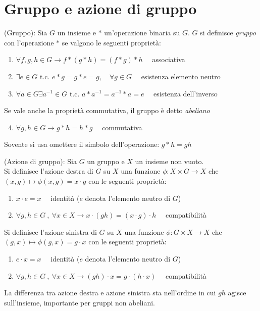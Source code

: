 \section{Gruppo e azione di gruppo}

\begin{definition}{(Gruppo)}:
   Sia $G$ un insieme e $*$ un'operazione binaria su $G$. $G$ si definisce
   \emph{gruppo} con l'operazione $*$ se valgono le seguenti proprietà:
   \begin{enumerate}
      \item $ \forall f,g,h \in G \to f*(g*h) = (f*g)*h \quad$ associativa
      \item $ \exists e \in G $ t.c. $ e*g = g*e = g ,\quad \forall g \in G \quad$
       esistenza elemento neutro
      \item $ \forall a \in G \exists a^{-1} \in G $ t.c. $a*a^{-1} = a^{-1}*a = e \quad$
         esistenza dell'inverso
   \end{enumerate}
   Se vale anche la proprietà commutativa, il gruppo è detto \emph{abeliano}
   \begin{enumerate}\setcounter{enumi}{3}
      \item $ \forall g,h \in G \to g*h = h*g \quad$ commutativa
   \end{enumerate}
\end{definition}
Sovente si usa omettere il simbolo dell'operazione: $ g*h = gh $
\begin{definition}{(Azione di gruppo):}\label{def:groupaction}
   Sia $G$ un gruppo e $X$ un insieme non vuoto. \\
   Si definisce l'azione destra di $G$ su $X$
   una funzione $\phi : X \times G \to X$ che $(x,g) \mapsto \phi(x,g) = x \cdot g$
   con le seguenti proprietà:
   \begin{enumerate}
      \item $x \cdot e = x \quad$ identità
          ($e$ denota l'elemento neutro di $G$)
      \item $\forall g,h \in G \: , \: \forall x \in X \to
         x\cdot (gh) = (x \cdot g) \cdot h \quad $ compatibilità
   \end{enumerate}
   Si definisce l'azione sinistra di $G$ su $X$
   una funzione $\phi : G \times X \to X$ che $(g,x) \mapsto \phi(g,x) =  g \cdot x $
   con le seguenti proprietà:
   \begin{enumerate}
      \item $e \cdot x = x \quad$ identità
          ($e$ denota l'elemento neutro di $G$)
      \item $\forall g,h \in G \: , \: \forall x \in X \to
         (gh) \cdot x  = g \cdot (h \cdot x) \quad $ compatibilità
   \end{enumerate}
\end{definition}
La differenza tra azione destra e azione sinistra sta nell'ordine in cui $gh$
agisce sull'insieme, importante per gruppi non abeliani.\\

